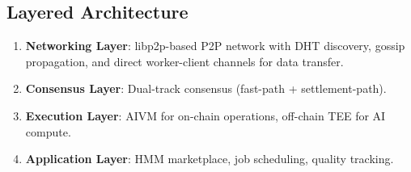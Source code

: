\subsection{Layered Architecture}

\begin{enumerate}[leftmargin=1.4em]
    \item \textbf{Networking Layer}: libp2p-based P2P network with DHT discovery, gossip propagation, and direct worker-client channels for data transfer.
    \item \textbf{Consensus Layer}: Dual-track consensus (fast-path + settlement-path).
    \item \textbf{Execution Layer}: AIVM for on-chain operations, off-chain TEE for AI compute.
    \item \textbf{Application Layer}: HMM marketplace, job scheduling, quality tracking.
\end{enumerate}

